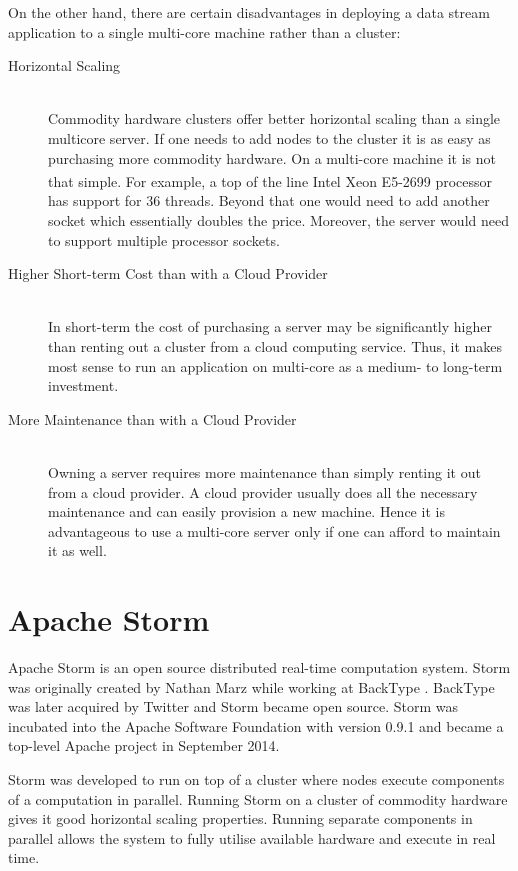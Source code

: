 \documentclass[bsc,deptreport,twoside,singlespacing,normalheadings,parskip]{infthesis}\usepackage[]{graphicx}\usepackage[]{color}
\begin{document}
On the other hand, there are certain disadvantages in deploying a data stream application to a single multi-core machine rather than a cluster:

\begin{description}
	\item[Horizontal Scaling] \hfill \\
	Commodity hardware clusters offer better horizontal scaling than a single multicore server. If one needs to add nodes to the cluster it is as easy as purchasing more commodity hardware. On a multi-core machine it is not that simple. For example, a top of the line Intel\textsuperscript{\textregistered} Xeon\textsuperscript{\textregistered} E5-2699 processor has support for 36 threads. Beyond that one would need to add another socket which essentially doubles the price. Moreover, the server would need to support multiple processor sockets.
	\item[Higher Short-term Cost than with a Cloud Provider] \hfill \\
	In short-term the cost of purchasing a server may be significantly higher than renting out a cluster from a cloud computing service. Thus, it makes most sense to run an application on multi-core as a medium- to long-term investment.
	\item[More Maintenance than with a Cloud Provider] \hfill \\
	Owning a server requires more maintenance than simply renting it out from a cloud provider. A cloud provider usually does  all the necessary maintenance and can easily provision a new machine. Hence it is advantageous to use a multi-core server only if one can afford to maintain it as well.
\end{description}

\section{Apache Storm}
\label{sec:apache_storm}

Apache Storm is an open source distributed real-time computation system. Storm was originally created by Nathan Marz while working at BackType \cite{NathanAbout}. BackType was later acquired by Twitter and Storm became open source. Storm was incubated into the Apache Software Foundation with version 0.9.1 and became a top-level Apache project in September 2014.

Storm was developed to run on top of a cluster where nodes execute components of a computation in parallel. Running Storm on a cluster of commodity hardware gives it good horizontal scaling properties. Running separate components in parallel allows the system to fully utilise available hardware and execute in real time.
\end{document}
